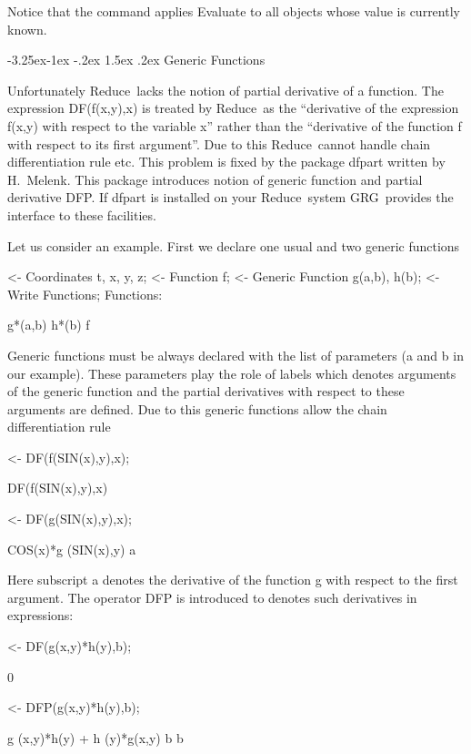 \documentclass[twoside,openright]{report}
\makeatletter
\newcommand{\grgtt}{\ttfamily}
\newcommand{\shadedbox}[1]{\fbox{#1}}
\renewcommand{\tt}{\grgtt}
\newcommand{\grg}{{\sc GRG}}
\newcommand{\reduce}{{\sc Reduce}}
\def\mynewline{\ifvmode \relax \else
               \unskip\nobreak\hfil\break\fi}
\newcommand{\command}[1]{\vspace{1.2mm}\mynewline\hspace*{6mm}%
\shadedbox{\begin{tabular}{l}\tt%
#1 \end{tabular}}\vspace{1.2mm}\newline}
\newcommand{\file}[1]{{\sf#1}}
\newcommand{\comm}[1]{{\upshape\tt#1}}    %
\renewcommand\subsection{\@startsection{subsection}{2}{\z@}%
                                     {-3.25ex\@plus -1ex \@minus -.2ex}%
                                     {1.5ex \@plus .2ex}%
                                     {\normalfont\large\slshape\bfseries}}
\makeatother
\begin{document}
Notice that the command
\command{Evaluate All;}
applies \comm{Evaluate} to all objects whose value is
currently known.

\subsection{Generic Functions}
\label{genfun}

Unfortunately \reduce\ lacks the notion of partial derivative of a function.
The expression \comm{DF(f(x,y),x)} is treated by \reduce\ as the
``derivative of the expression \comm{f(x,y)} with respect to
the variable \comm{x}''  rather than  the ``derivative of the function
\comm{f} with respect to its first argument''.
Due to this \reduce\ cannot handle
chain differentiation rule etc. This problem is fixed by the
package \file{dfpart} written by H.~Melenk.
This package introduces notion of generic function and
partial derivative \comm{DFP}. If \file{dfpart} is installed
on your \reduce\ system \grg\ provides the interface
to these facilities.



Let us consider an example. First we declare
one usual and two generic functions
\begin{slisting}
<- Coordinates t, x, y, z;
<- Function f;
<- Generic Function g(a,b), h(b);
<- Write Functions;
Functions:

g*(a,b) h*(b) f
\end{slisting}
Generic functions  must be always declared with
the list of parameters (\comm{a} and \comm{b} in our example).
These parameters play the role of labels which denotes
arguments of the generic function and the partial
derivatives with respect to these arguments
are defined. Due to this generic functions allow the
chain differentiation rule
\begin{slisting}
<- DF(f(SIN(x),y),x);

DF(f(SIN(x),y),x)

<- DF(g(SIN(x),y),x);

COS(x)*g (SIN(x),y)
        a
\end{slisting}
Here subscript \comm{a} denotes
the derivative of the function \comm{g} with respect to the
first argument.  \enlargethispage{5mm}
The operator \comm{DFP} is introduced to denotes such
derivatives in expressions:
\begin{slisting}
<- DF(g(x,y)*h(y),b);

0

<- DFP(g(x,y)*h(y),b);

g (x,y)*h(y) + h (y)*g(x,y)
 b              b
\end{slisting}
\end{document}
